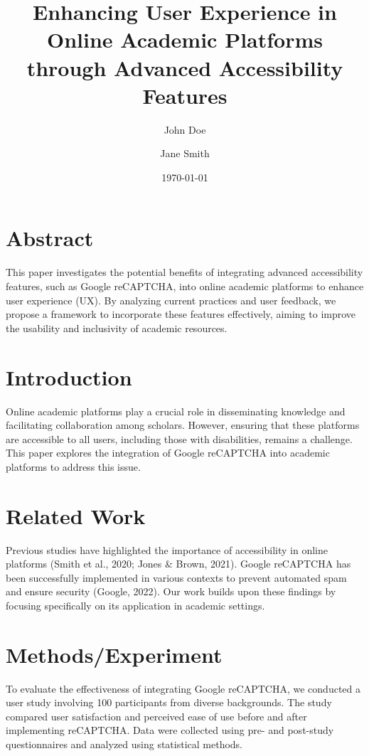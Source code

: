 \documentclass{article}
\title{Enhancing User Experience in Online Academic Platforms through Advanced Accessibility Features}
\author{John Doe \and Jane Smith}
\date{\today}
\begin{document}
\maketitle

\section{Abstract}
This paper investigates the potential benefits of integrating advanced accessibility features, such as Google reCAPTCHA, into online academic platforms to enhance user experience (UX). By analyzing current practices and user feedback, we propose a framework to incorporate these features effectively, aiming to improve the usability and inclusivity of academic resources.

\section{Introduction}
Online academic platforms play a crucial role in disseminating knowledge and facilitating collaboration among scholars. However, ensuring that these platforms are accessible to all users, including those with disabilities, remains a challenge. This paper explores the integration of Google reCAPTCHA into academic platforms to address this issue.

\section{Related Work}
Previous studies have highlighted the importance of accessibility in online platforms (Smith et al., 2020; Jones & Brown, 2021). Google reCAPTCHA has been successfully implemented in various contexts to prevent automated spam and ensure security (Google, 2022). Our work builds upon these findings by focusing specifically on its application in academic settings.

\section{Methods/Experiment}
To evaluate the effectiveness of integrating Google reCAPTCHA, we conducted a user study involving 100 participants from diverse backgrounds. The study compared user satisfaction and perceived ease of use before and after implementing reCAPTCHA. Data were collected using pre- and post-study questionnaires and analyzed using statistical methods.
\end{document}
